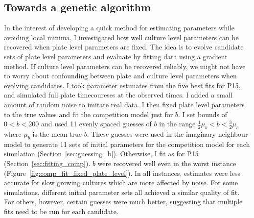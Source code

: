 \begin{multicols}{2}
\subsection{Towards a genetic algorithm}

In the interest of developing a quick method for estimating parameters
while avoiding local minima, I investigated how well culture level
parameters can be recovered when plate level parameters are fixed. The
idea is to evolve candidate sets of plate level parameters and
evaluate by fitting data using a gradient method. If culture level
parameters can be recovered reliably, we might not have to worry about
confounding between plate and culture level parameters when evolving
candidates. I took parameter estimates from the five best fits for
P15, and simulated full plate timecoureses at the observed times. I
added a small amount of random noise to imitate real data. I then
fixed plate level parameters to the true values and fit the
competition model just for \(b\). I set bounds of \(0 < b < 200\) and
used 11 evenly spaced guesses of \(b\) in the range
\(\frac{1}{2}\mu_{b} < b < \frac{3}{2}\mu_{b}\) where \(\mu_{b}\) is
the mean true \(b\). These guesses were used in the imaginary
neighbour model to generate 11 sets of initial parameters for the
competition model for each simulation (Section~\ref{sec:guessing_b}).
Otherwise, I fit as for P15 (Section~\ref{sec:fitting_comp}). \(b\)
were recovered well even in the worst instance
(Figure~\ref{fig:comp_fit_fixed_plate_level}). In all instances,
estimates were less accurate for slow growing cultures which are more
affected by noise. For some simulations, different initial parameter
sets all achieved a similar quality of fit. For others, however,
certain guesses were much better, suggesting that multiple fits need
to be run for each candidate.


\end{multicols}
